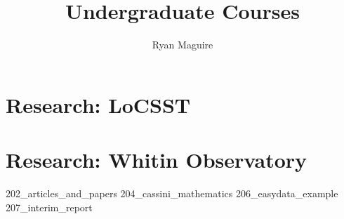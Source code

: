 \documentclass[crop=false,class=book,oneside]{standalone}
\title{Undergraduate Courses}
\author{Ryan Maguire}
\date{\vspace{-5ex}}
\begin{document}
\part{Research: LoCSST}
\part{Research: Whitin Observatory}
{202_articles_and_papers}
{204_cassini_mathematics}
{206_easydata_example}
{207_interim_report}
\end{document}
